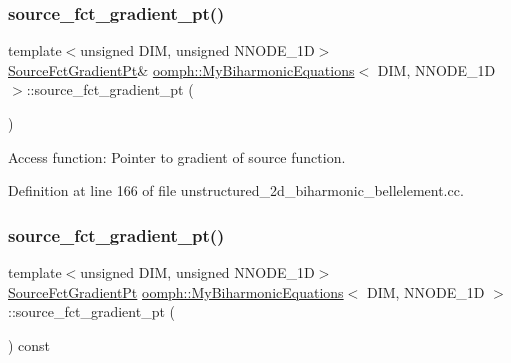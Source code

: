 \subsubsection{\texorpdfstring{source\+\_\+fct\+\_\+gradient\+\_\+pt()}{source\_fct\_gradient\_pt()}\hspace{0.1cm}{\footnotesize\ttfamily [1/4]}}
{\footnotesize\ttfamily template$<$unsigned D\+IM, unsigned N\+N\+O\+D\+E\+\_\+1D$>$ \\
\hyperlink{classoomph_1_1MyBiharmonicEquations_af007c03701e888fed7375cb4537f0046}{Source\+Fct\+Gradient\+Pt}\& \hyperlink{classoomph_1_1MyBiharmonicEquations}{oomph\+::\+My\+Biharmonic\+Equations}$<$ D\+IM, N\+N\+O\+D\+E\+\_\+1D $>$\+::source\+\_\+fct\+\_\+gradient\+\_\+pt (\begin{DoxyParamCaption}{ }\end{DoxyParamCaption})\hspace{0.3cm}{\ttfamily [inline]}}



Access function\+: Pointer to gradient of source function. 



Definition at line 166 of file unstructured\+\_\+2d\+\_\+biharmonic\+\_\+bellelement.\+cc.

\mbox{\label{classoomph_1_1MyBiharmonicEquations_a3c6a713fdc0847a374c58ef4760046ec}} 
\subsubsection{\texorpdfstring{source\+\_\+fct\+\_\+gradient\+\_\+pt()}{source\_fct\_gradient\_pt()}\hspace{0.1cm}{\footnotesize\ttfamily [2/4]}}
{\footnotesize\ttfamily template$<$unsigned D\+IM, unsigned N\+N\+O\+D\+E\+\_\+1D$>$ \\
\hyperlink{classoomph_1_1MyBiharmonicEquations_af007c03701e888fed7375cb4537f0046}{Source\+Fct\+Gradient\+Pt} \hyperlink{classoomph_1_1MyBiharmonicEquations}{oomph\+::\+My\+Biharmonic\+Equations}$<$ D\+IM, N\+N\+O\+D\+E\+\_\+1D $>$\+::source\+\_\+fct\+\_\+gradient\+\_\+pt (\begin{DoxyParamCaption}{ }\end{DoxyParamCaption}) const\hspace{0.3cm}{\ttfamily [inline]}}




